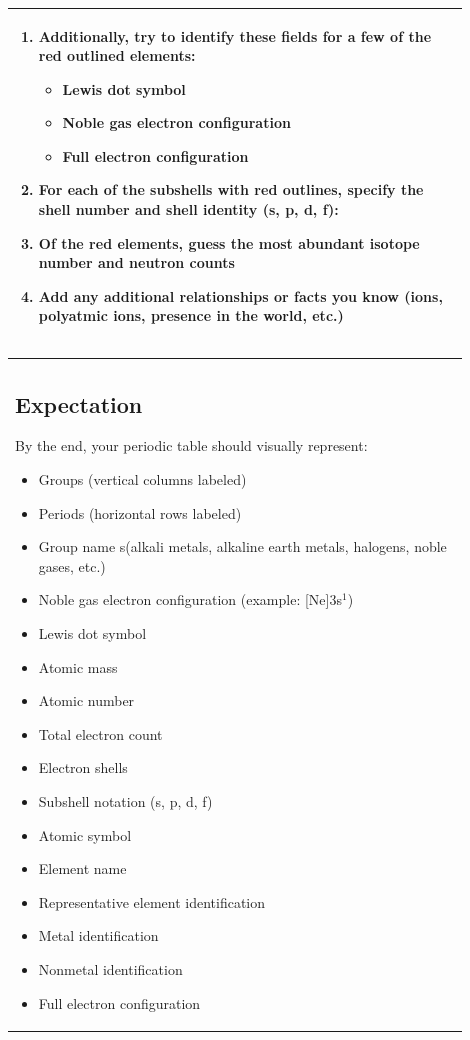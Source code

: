 \documentclass{article}
\begin{document}
\begin{flushleft}
\begin{tabular}{|p{0.9\linewidth}|}
\begin{enumerate}
\item Additionally, try to identify these fields for a few of the red outlined elements:
\begin{itemize}
\item Lewis dot symbol
\item Noble gas electron configuration
\item Full electron configuration
\end{itemize}

\item For each of the subshells with red outlines, specify the shell number and shell identity (s, p, d, f):

\item Of the red elements, guess the most abundant isotope number and neutron counts

\item Add any additional relationships or facts you know (ions, polyatmic ions, presence in the world, etc.)
\end{enumerate} \\

\hline
\end{tabular}

\begin{tabular}{|p{0.9\linewidth}|}
\hline

\subsection*{Expectation}

By the end, your periodic table should visually represent:\begin{itemize}
    \item Groups (vertical columns labeled)
    \item Periods (horizontal rows labeled)
    \item Group name s(alkali metals, alkaline earth metals, halogens, noble gases, etc.)
    \item Noble gas electron configuration (example: [Ne]3s$^1$)
    \item Lewis dot symbol
    \item Atomic mass
    \item Atomic number
    \item Total electron count
    \item Electron shells
    \item Subshell notation (s, p, d, f)
    \item Atomic symbol
    \item Element name
    \item Representative element identification
    \item Metal identification
    \item Nonmetal identification
    \item Full electron configuration
\end{itemize}


\end{tabular}
\end{flushleft}
\end{document}
